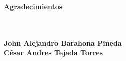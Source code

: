 \newpage{\pagestyle{empty}\cleardoublepage}

\newpage
\thispagestyle{empty} \textbf{}\normalsize
\\\\\\%
\textbf{\LARGE Agradecimientos}
\\\\

\textbf{John Alejandro Barahona Pineda}\\

\textbf{César Andres Tejada Torres}\\

\newpage{\pagestyle{empty}\cleardoublepage}